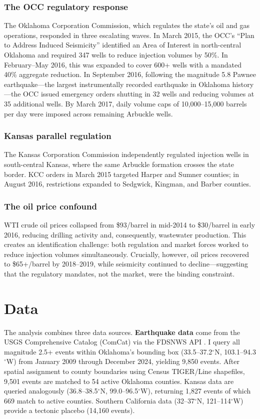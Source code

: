 \documentclass[12pt]{article}
\begin{document}
\subsubsection*{The OCC regulatory response} The Oklahoma Corporation Commission, which regulates the state's oil and gas operations, responded in three escalating waves. In March 2015, the OCC's ``Plan to Address Induced Seismicity'' identified an Area of Interest in north-central Oklahoma and required 347 wells to reduce injection volumes by 50\%. In February--May 2016, this was expanded to cover 600+ wells with a mandated 40\% aggregate reduction. In September 2016, following the magnitude 5.8 Pawnee earthquake---the largest instrumentally recorded earthquake in Oklahoma history---the OCC issued emergency orders shutting in 32 wells and reducing volumes at 35 additional wells. By March 2017, daily volume caps of 10,000--15,000 barrels per day were imposed across remaining Arbuckle wells.

\subsubsection*{Kansas parallel regulation} The Kansas Corporation Commission independently regulated injection wells in south-central Kansas, where the same Arbuckle formation crosses the state border. KCC orders in March 2015 targeted Harper and Sumner counties; in August 2016, restrictions expanded to Sedgwick, Kingman, and Barber counties.

\subsubsection*{The oil price confound} WTI crude oil prices collapsed from \$93/barrel in mid-2014 to \$30/barrel in early 2016, reducing drilling activity and, consequently, wastewater production. This creates an identification challenge: both regulation and market forces worked to reduce injection volumes simultaneously. Crucially, however, oil prices recovered to \$65+/barrel by 2018--2019, while seismicity continued to decline---suggesting that the regulatory mandates, not the market, were the binding constraint.

\section{Data}

The analysis combines three data sources. \textbf{Earthquake data} come from the USGS Comprehensive Catalog (ComCat) via the FDSNWS API \citep{usgscomcat}. I query all magnitude 2.5+ events within Oklahoma's bounding box (33.5--37.2$^\circ$N, 103.1--94.3$^\circ$W) from January 2009 through December 2024, yielding 9,850 events. After spatial assignment to county boundaries using Census TIGER/Line shapefiles, 9,501 events are matched to 54 active Oklahoma counties. Kansas data are queried analogously (36.8--38.5$^\circ$N, 99.0--96.5$^\circ$W), returning 1,827 events of which 669 match to active counties. Southern California data (32--37$^\circ$N, 121--114$^\circ$W) provide a tectonic placebo (14,160 events).
\end{document}
